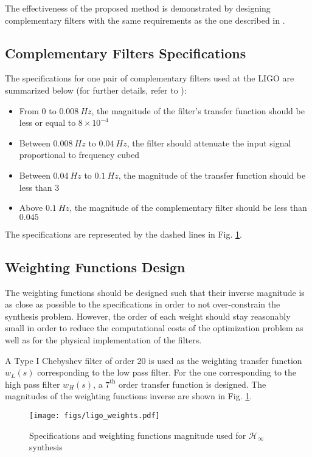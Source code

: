 \documentclass[letterpaper, 10 pt, conference]{ieeeconf}
\begin{document}
The effectiveness of the proposed method is demonstrated by designing complementary filters with the same requirements as the one described in \cite{hua05_low_ligo}.
\subsection{Complementary Filters Specifications}
\label{sec:org0bf5de3}
\label{sec:ligo_specifications}
The specifications for one pair of complementary filters used at the LIGO are summarized below (for further details, refer to \cite{hua04_polyp_fir_compl_filter_contr_system}):
\begin{itemize}
\item From \(0\) to \(\SI{0.008}{Hz}\), the magnitude of the filter's transfer function should be less or equal to \(8 \times 10^{-4}\)
\item Between \(\SI{0.008}{Hz}\) to \(\SI{0.04}{Hz}\), the filter should attenuate the input signal proportional to frequency cubed
\item Between \(\SI{0.04}{Hz}\) to \(\SI{0.1}{Hz}\), the magnitude of the transfer function should be less than \(3\)
\item Above \(\SI{0.1}{Hz}\), the magnitude of the complementary filter should be less than \(0.045\)
\end{itemize}

The specifications are represented by the dashed lines in Fig. \ref{fig:ligo_weights}.

\subsection{Weighting Functions Design}
\label{sec:org0a19352}
\label{sec:ligo_weights}
The weighting functions should be designed such that their inverse magnitude is as close as possible to the specifications in order to not over-constrain the synthesis problem.
However, the order of each weight should stay reasonably small in order to reduce the computational costs of the optimization problem as well as for the physical implementation of the filters.

A Type I Chebyshev filter of order \(20\) is used as the weighting transfer function \(w_L(s)\) corresponding to the low pass filter. For the one corresponding to the high pass filter \(w_H(s)\), a \(7^{\text{th}}\) order transfer function is designed.
The magnitudes of the weighting functions inverse are shown in Fig. \ref{fig:ligo_weights}.

\begin{figure}[htbp]
\centering
\texttt{[image: figs/ligo\_weights.pdf]}
\caption{\label{fig:ligo_weights}
Specifications and weighting functions magnitude used for \(\mathcal{H}_\infty\) synthesis}
\end{figure}
\end{document}
